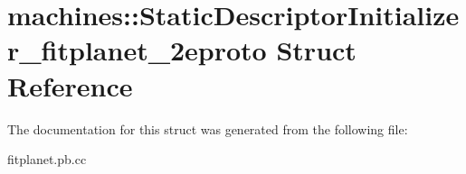 \hypertarget{structmachines_1_1StaticDescriptorInitializer__fitplanet__2eproto}{\section{machines\-:\-:Static\-Descriptor\-Initializer\-\_\-fitplanet\-\_\-2eproto Struct Reference}
\label{structmachines_1_1StaticDescriptorInitializer__fitplanet__2eproto}
}


The documentation for this struct was generated from the following file\-:\begin{DoxyCompactItemize}
\item 
fitplanet.\-pb.\-cc\end{DoxyCompactItemize}
